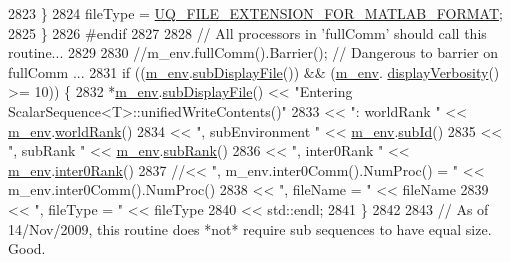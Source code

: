 \begin{DoxyCode}
2823     \}
2824     fileType = \hyperlink{_defines_8h_ac440026eff7deb1c1eed1eea0e8e36ba}{UQ\_FILE\_EXTENSION\_FOR\_MATLAB\_FORMAT};
2825   \}
2826 \textcolor{preprocessor}{#endif}
2827 \textcolor{preprocessor}{}
2828   \textcolor{comment}{// All processors in 'fullComm' should call this routine...}
2829 
2830   \textcolor{comment}{//m\_env.fullComm().Barrier(); // Dangerous to barrier on fullComm ...}
2831   \textcolor{keywordflow}{if} ((\hyperlink{class_q_u_e_s_o_1_1_scalar_sequence_a71618cd6351b29361b437af68447a4c8}{m\_env}.\hyperlink{class_q_u_e_s_o_1_1_base_environment_a8a0064746ae8dddfece4229b9ad374d6}{subDisplayFile}()) && (\hyperlink{class_q_u_e_s_o_1_1_scalar_sequence_a71618cd6351b29361b437af68447a4c8}{m\_env}.
      \hyperlink{class_q_u_e_s_o_1_1_base_environment_a1fe5f244fc0316a0ab3e37463f108b96}{displayVerbosity}() >= 10)) \{
2832     *\hyperlink{class_q_u_e_s_o_1_1_scalar_sequence_a71618cd6351b29361b437af68447a4c8}{m\_env}.\hyperlink{class_q_u_e_s_o_1_1_base_environment_a8a0064746ae8dddfece4229b9ad374d6}{subDisplayFile}() << \textcolor{stringliteral}{"Entering ScalarSequence<T>::unifiedWriteContents()"}
2833                             << \textcolor{stringliteral}{": worldRank "}      << \hyperlink{class_q_u_e_s_o_1_1_scalar_sequence_a71618cd6351b29361b437af68447a4c8}{m\_env}.\hyperlink{class_q_u_e_s_o_1_1_base_environment_a78b57112bbd0e6dd0e8afec00b40ffa7}{worldRank}()
2834                             << \textcolor{stringliteral}{", subEnvironment "} << \hyperlink{class_q_u_e_s_o_1_1_scalar_sequence_a71618cd6351b29361b437af68447a4c8}{m\_env}.\hyperlink{class_q_u_e_s_o_1_1_base_environment_a6ae3174897a9b3a4c85fa18da5d4c16f}{subId}()
2835                             << \textcolor{stringliteral}{", subRank "}        << \hyperlink{class_q_u_e_s_o_1_1_scalar_sequence_a71618cd6351b29361b437af68447a4c8}{m\_env}.\hyperlink{class_q_u_e_s_o_1_1_base_environment_a172d52f993f1322ed45aaddf71518dbb}{subRank}()
2836                             << \textcolor{stringliteral}{", inter0Rank "}     << \hyperlink{class_q_u_e_s_o_1_1_scalar_sequence_a71618cd6351b29361b437af68447a4c8}{m\_env}.\hyperlink{class_q_u_e_s_o_1_1_base_environment_ae106b5bb8a80b655b88b3a26b1e7c185}{inter0Rank}()
2837       \textcolor{comment}{//<< ", m\_env.inter0Comm().NumProc() = " << m\_env.inter0Comm().NumProc()}
2838                             << \textcolor{stringliteral}{", fileName = "}     << fileName
2839                             << \textcolor{stringliteral}{", fileType = "}     << fileType
2840                             << std::endl;
2841   \}
2842 
2843   \textcolor{comment}{// As of 14/Nov/2009, this routine does *not* require sub sequences to have equal size. Good.}

\end{DoxyCode}
